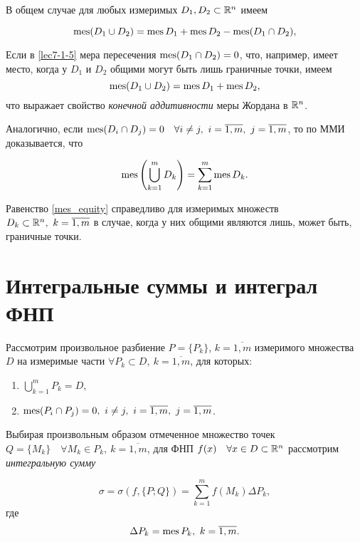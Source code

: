 \documentclass[../../main.tex]{subfiles}
\begin{document}
В общем случае для любых измеримых $D_1, D_2 \subset \mathbb{R}^n$ имеем

\begin{equation}
\label{lec7-1-5}
\operatorname{mes} (D_1 \cup D_2) = \operatorname{mes} D_1 + \operatorname{mes} D_2 - \operatorname{mes}(D_1 \cap D_2),
\end{equation}

Если в \eqref{lec7-1-5} мера пересечения $\operatorname{mes}(D_1 \cap 
D_2) = 0$, что, например, имеет место, когда у $D_1$ и 
$D_2$ общими могут быть лишь граничные точки, имеем
\[
	\operatorname{mes}(D_1 \cup D_2) = \operatorname{mes} D_1 + \operatorname{mes} D_2,
\]
что выражает свойство \emph{конечной аддитивности} меры Жордана в $\mathbb{R}^n$.

Аналогично, если $\operatorname{mes}(D_i \cap D_j) = 0\quad 
\forall i \ne j,\ i = \overline{1,m},\ j = \overline{1,m}$, 
то по ММИ доказывается, что

\begin{equation}
\label{mes_equity}
\operatorname{mes}\left(\bigcup_{k=1}^m D_k \right) = \sum_{k=1}^{m} \operatorname{mes} D_k.
\end{equation}

Равенство \eqref{mes_equity} справедливо для измеримых множеств 
$D_k \subset \mathbb{R}^n,\ k = \overline{1,m}$ в случае, 
когда у них общими являются лишь, может быть, граничные точки.

\section{Интегральные суммы и интеграл ФНП}

Рассмотрим произвольное разбиение $P = \{P_k\}$, ${k = 
\overline{1, m}}$ измеримого множества $D$
на измеримые части $\forall P_k \subset D,\ k = 
\overline{1, m}$, для которых:

\begin{enumerate}
	\item $\bigcup\limits_{k = 1}^m P_k = D$,
	\item $\operatorname{mes}(P_i \cap P_j) = 0,\ i \neq j,\ i = 
	\overline{1, m},\ j = \overline{1, m}$.
\end{enumerate}

Выбирая произвольным образом отмеченное множество точек 
$Q = \{M_k\}\quad \forall M_k \in P_k,\ k = \overline{1, m}$,
для ФНП $f(x)\quad \forall x \in D \subset \mathbb{R}^n $ 
рассмотрим \emph{интегральную сумму}

\begin{equation}
\sigma = \sigma(f, \{P; Q\}) = \sum\limits_{k = 1}^mf(M_k)\Delta{P_k},
\end{equation}
где \[\Delta{P_k} = \operatorname{mes} P_k,\ k = \overline{1, m}.\]
\end{document}
